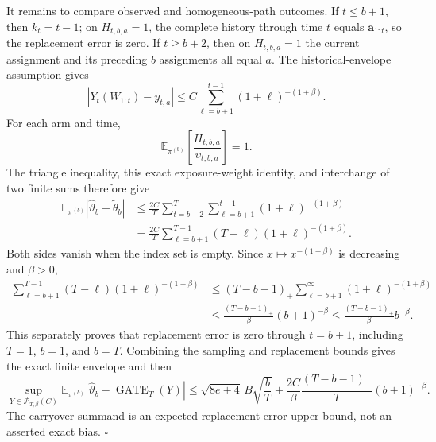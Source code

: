 It remains to compare observed and homogeneous-path outcomes. If \(t\le b+1\), then \(k_t=t-1\); on \(H_{t,b,a}=1\), the complete history through time \(t\) equals \(\mathbf a_{1:t}\), so the replacement error is zero. If \(t\ge b+2\), then on \(H_{t,b,a}=1\) the current assignment and its preceding \(b\) assignments all equal \(a\). The historical-envelope assumption gives
\[
|Y_t(W_{1:t})-y_{t,a}|
\le C\sum_{\ell=b+1}^{t-1}(1+\ell)^{-(1+\beta)}.
\]
For each arm and time,
\[
\mathbb E_{\pi^{(b)}}\left[\frac{H_{t,b,a}}{\upsilon_{t,b,a}}\right]=1.
\]
The triangle inequality, this exact exposure-weight identity, and interchange of two finite sums therefore give
\[
\begin{aligned}
\mathbb E_{\pi^{(b)}}|\widehat\vartheta_b-\widetilde\theta_b|
&\le\frac{2C}{T}\sum_{t=b+2}^T\sum_{\ell=b+1}^{t-1}(1+\ell)^{-(1+\beta)}\\
&=\frac{2C}{T}\sum_{\ell=b+1}^{T-1}(T-\ell)(1+\ell)^{-(1+\beta)}.
\end{aligned}
\]
Both sides vanish when the index set is empty. Since \(x\mapsto x^{-(1+\beta)}\) is decreasing and \(\beta>0\),
\[
\begin{aligned}
\sum_{\ell=b+1}^{T-1}(T-\ell)(1+\ell)^{-(1+\beta)}
&\le (T-b-1)_+\sum_{\ell=b+1}^{\infty}(1+\ell)^{-(1+\beta)}\\
&\le\frac{(T-b-1)_+}{\beta}(b+1)^{-\beta}
\le\frac{(T-b-1)_+}{\beta}b^{-\beta}.
\end{aligned}
\]
This separately proves that replacement error is zero through \(t=b+1\), including \(T=1\), \(b=1\), and \(b=T\). Combining the sampling and replacement bounds gives the exact finite envelope and then
\[
\sup_{Y\in\mathcal P_{T,\beta}(C)}
\mathbb E_{\pi^{(b)}}|\widehat\vartheta_b-\operatorname{GATE}_T(Y)|
\le \sqrt{8e+4}\,B\sqrt{\frac bT}
+\frac{2C}{\beta}\frac{(T-b-1)_+}{T}(b+1)^{-\beta}.
\]
The carryover summand is an expected replacement-error upper bound, not an asserted exact bias. \(\square\)